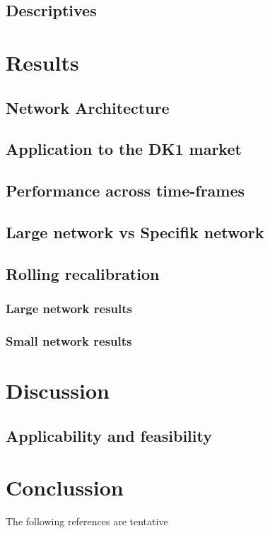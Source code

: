 \documentclass[10pt,a4paper]{article}
\numberwithin{equation}{section} %
\begin{document}
\subsection{Descriptives}

\section{Results}
\subsection{Network Architecture}

\subsection{Application to the DK1 market}
\subsection{Performance across time-frames}
\subsection{Large network vs Specifik network}


\subsection{Rolling recalibration}
\subsubsection{Large network results}
\subsubsection{Small network results}

\section{Discussion}
\subsection{Applicability and feasibility}

\section{Conclussion}

The following references are tentative\notecite{*}
\newpage
{}
{}
\printbibliography
\end{document}
